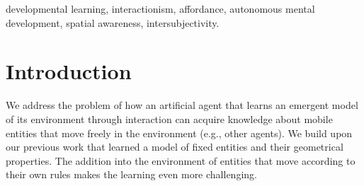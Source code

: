 \documentclass[conference]{IEEEtran}
\begin{document}
\begin{IEEEkeywords}
developmental learning, interactionism, affordance, autonomous mental development, spatial awareness, intersubjectivity.
\end{IEEEkeywords}

\section{Introduction}

We address the problem of how an artificial agent that learns an emergent model of its environment through interaction can acquire knowledge about mobile entities that move freely in the environment (e.g., other agents). 
We build upon our previous work that learned a model of fixed entities and their geometrical properties. The addition into the environment of entities that move according to their own rules makes the learning even more challenging.





\end{document}
